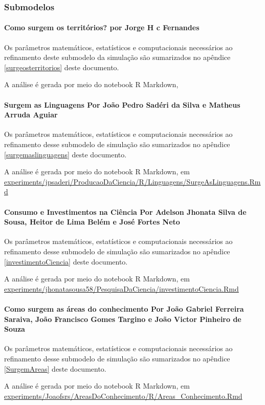 \subsubsection{Submodelos}

\paragraph{Como surgem os territórios? por Jorge H c Fernandes}

Os parâmetros matemáticos, estatísticos e computacionais necessários ao refinamento deste submodelo da simulação são sumarizados no apêndice \ref{surgeosterritorios} deste documento.

A análise é gerada por meio do notebook R Markdown, 
%


\paragraph{Surgem as Linguagens Por João Pedro Sadéri da Silva e Matheus Arruda Aguiar}

Os parâmetros matemáticos, estatísticos e computacionais necessários ao refinamento desse submodelo de simulação são sumarizados no apêndice \ref{surgemaslinguagens} deste documento.

A análise é gerada por meio do notebook R Markdown, em \url{experiments/jpsaderi/ProducaoDaCiencia/R/Linguagens/SurgeAsLinguagens.Rmd}

\paragraph{Consumo e Investimentos na Ciência Por Adelson Jhonata Silva de Sousa, Heitor de Lima Belém e José Fortes Neto}

Os parâmetros matemáticos, estatísticos e computacionais necessários ao refinamento desse submodelo de simulação são sumarizados no apêndice \ref{investimentoCiencia} deste documento.

A análise é gerada por meio do notebook R Markdown, em \url{experiments/jhonatasousa58/PesquisaDaCiencia/investimentoCiencia.Rmd}

\paragraph{Como surgem as áreas do conhecimento Por João Gabriel Ferreira Saraiva, João Francisco Gomes Targino e João Victor Pinheiro de Souza}

Os parâmetros matemáticos, estatísticos e computacionais necessários ao refinamento desse submodelo de simulação são sumarizados no apêndice \ref{SurgemAreas} deste documento.

A análise é gerada por meio do notebook R Markdown, em \url{experiments/Joaofsrs/AreasDoConhecimento/R/Areas_Conhecimento.Rmd}
